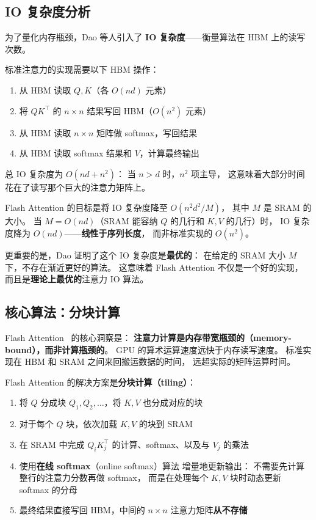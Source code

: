 \subsection{IO 复杂度分析}

为了量化内存瓶颈，Dao 等人引入了
\textbf{IO 复杂度}——衡量算法在 HBM 上的读写次数。

标准注意力的实现需要以下 HBM 操作：
\begin{enumerate}[noitemsep]
  \item 从 HBM 读取 $Q, K$（各 $O(nd)$ 元素）
  \item 将 $QK^\top$ 的 $n \times n$ 结果写回 HBM（$O(n^2)$ 元素）
  \item 从 HBM 读取 $n \times n$ 矩阵做 softmax，写回结果
  \item 从 HBM 读取 softmax 结果和 $V$，计算最终输出
\end{enumerate}
总 IO 复杂度为 $O(nd + n^2)$：
当 $n > d$ 时，$n^2$ 项主导，
这意味着大部分时间花在了读写那个巨大的注意力矩阵上。

Flash Attention 的目标是将 IO 复杂度降至 $O(n^2 d^2 / M)$，
其中 $M$ 是 SRAM 的大小。
当 $M = O(nd)$（SRAM 能容纳 $Q$ 的几行和 $K, V$ 的几行）时，
IO 复杂度降为 $O(nd)$——\textbf{线性于序列长度}，
而非标准实现的 $O(n^2)$。

更重要的是，Dao 证明了这个 IO 复杂度是\textbf{最优的}：
在给定的 SRAM 大小 $M$ 下，不存在渐近更好的算法。
这意味着 Flash Attention 不仅是一个好的实现，
而且是\textbf{理论上最优的}注意力 IO 算法。

\subsection{核心算法：分块计算}

Flash Attention~\cite{dao2022flashattention,dao2023flashattention2}
的核心洞察是：
\textbf{注意力计算是内存带宽瓶颈的（memory-bound），而非计算瓶颈的}。
GPU 的算术运算速度远快于内存读写速度。
标准实现在 HBM 和 SRAM 之间来回搬运数据的时间，
远超实际的矩阵运算时间。

Flash Attention 的解决方案是\textbf{分块计算（tiling）}：
\begin{enumerate}[noitemsep]
  \item 将 $Q$ 分成块 $Q_1, Q_2, \ldots$，将 $K, V$ 也分成对应的块
  \item 对于每个 $Q$ 块，依次加载 $K, V$ 的块到 SRAM
  \item 在 SRAM 中完成 $Q_i K_j^\top$ 的计算、softmax、以及与 $V_j$ 的乘法
  \item 使用\textbf{在线 softmax}（online softmax）算法
        增量地更新输出：
        不需要先计算整行的注意力分数再做 softmax，
        而是在处理每个 $K, V$ 块时动态更新 softmax 的分母
  \item 最终结果直接写回 HBM，中间的 $n \times n$ 注意力矩阵\textbf{从不存储}
\end{enumerate}

